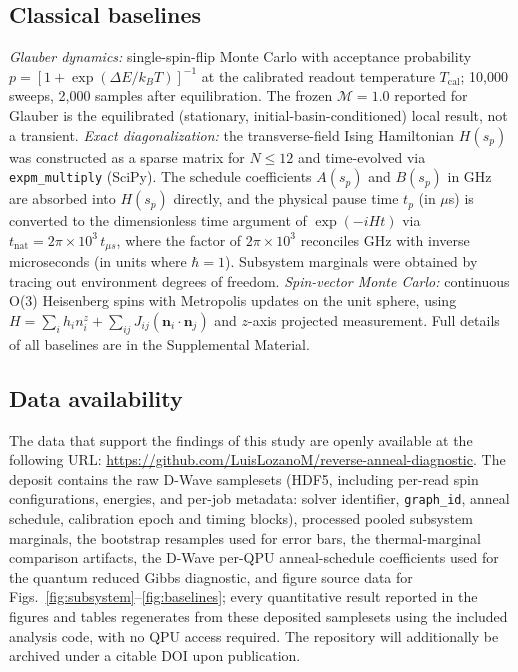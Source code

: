 \documentclass[aps,prapplied,reprint,superscriptaddress,floatfix,nofootinbib]{revtex4-2}
\begin{document}
\subsection{Classical baselines}

\emph{Glauber dynamics:} single-spin-flip Monte Carlo with acceptance probability $p = [1+\exp(\Delta E/k_BT)]^{-1}$ at the calibrated readout temperature $T_\mathrm{cal}$; 10{,}000 sweeps, 2{,}000 samples after equilibration.  The frozen $\mathcal{M}=1.0$ reported for Glauber is the equilibrated (stationary, initial-basin-conditioned) local result, not a transient.
\emph{Exact diagonalization:} the transverse-field Ising Hamiltonian $H(s_p)$ was constructed as a sparse matrix for $N\leq 12$ and time-evolved via \texttt{expm\_multiply} (SciPy).  The schedule coefficients $A(s_p)$ and $B(s_p)$ in GHz are absorbed into $H(s_p)$ directly, and the physical pause time $t_p$ (in $\mu$s) is converted to the dimensionless time argument of $\exp(-iHt)$ via $t_\mathrm{nat}=2\pi\times 10^{3}\,t_{\mu s}$, where the factor of $2\pi\times 10^3$ reconciles GHz with inverse microseconds (in units where $\hbar=1$).
Subsystem marginals were obtained by tracing out environment degrees of freedom.
\emph{Spin-vector Monte Carlo:} continuous O(3) Heisenberg spins with Metropolis updates on the unit sphere, using $H = \sum_i h_i n_i^z + \sum_{ij} J_{ij}(\mathbf{n}_i\cdot\mathbf{n}_j)$ and $z$-axis projected measurement.
Full details of all baselines are in the Supplemental Material.

\subsection{Data availability}

The data that support the findings of this study are openly available at the following URL: \url{https://github.com/LuisLozanoM/reverse-anneal-diagnostic}.
The deposit contains the raw D-Wave samplesets (HDF5, including per-read spin configurations, energies, and per-job metadata: solver identifier, \texttt{graph\_id}, anneal schedule, calibration epoch and timing blocks), processed pooled subsystem marginals, the bootstrap resamples used for error bars, the thermal-marginal comparison artifacts, the D-Wave per-QPU anneal-schedule coefficients used for the quantum reduced Gibbs diagnostic, and figure source data for Figs.~\ref{fig:subsystem}--\ref{fig:baselines}; every quantitative result reported in the figures and tables regenerates from these deposited samplesets using the included analysis code, with no QPU access required.
The repository will additionally be archived under a citable DOI upon publication.
\end{document}
